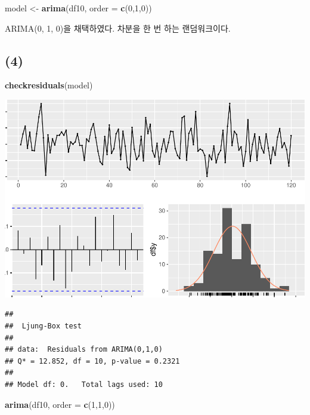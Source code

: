 \documentclass[
]{article}
\newenvironment{Shaded}{\begin{snugshade}}{\end{snugshade}}
\newcommand{\AttributeTok}[1]{\textcolor[rgb]{0.13,0.29,0.53}{#1}}
\newcommand{\DecValTok}[1]{\textcolor[rgb]{0.00,0.00,0.81}{#1}}
\newcommand{\FunctionTok}[1]{\textcolor[rgb]{0.13,0.29,0.53}{\textbf{#1}}}
\newcommand{\NormalTok}[1]{#1}
\newcommand{\OtherTok}[1]{\textcolor[rgb]{0.56,0.35,0.01}{#1}}
\begin{document}
\begin{Shaded}
\begin{Highlighting}[]
\NormalTok{model }\OtherTok{\textless{}{-}} \FunctionTok{arima}\NormalTok{(df10, }\AttributeTok{order =} \FunctionTok{c}\NormalTok{(}\DecValTok{0}\NormalTok{,}\DecValTok{1}\NormalTok{,}\DecValTok{0}\NormalTok{))}
\end{Highlighting}
\end{Shaded}

ARIMA(0, 1, 0)을 채택하였다. 차분을 한 번 하는 랜덤워크이다.

\subsection{(4)}\label{section-3}

\begin{Shaded}
\begin{Highlighting}[]
\FunctionTok{checkresiduals}\NormalTok{(model)}
\end{Highlighting}
\end{Shaded}

\begin{center}\includegraphics[width=0.8\linewidth]{Timeseries_Analysis_HW4_files/figure-latex/unnamed-chunk-9-1} \end{center}

\begin{verbatim}
## 
##  Ljung-Box test
## 
## data:  Residuals from ARIMA(0,1,0)
## Q* = 12.852, df = 10, p-value = 0.2321
## 
## Model df: 0.   Total lags used: 10
\end{verbatim}

\begin{Shaded}
\begin{Highlighting}[]
\FunctionTok{arima}\NormalTok{(df10, }\AttributeTok{order =} \FunctionTok{c}\NormalTok{(}\DecValTok{1}\NormalTok{,}\DecValTok{1}\NormalTok{,}\DecValTok{0}\NormalTok{))}
\end{Highlighting}
\end{Shaded}
\end{document}
